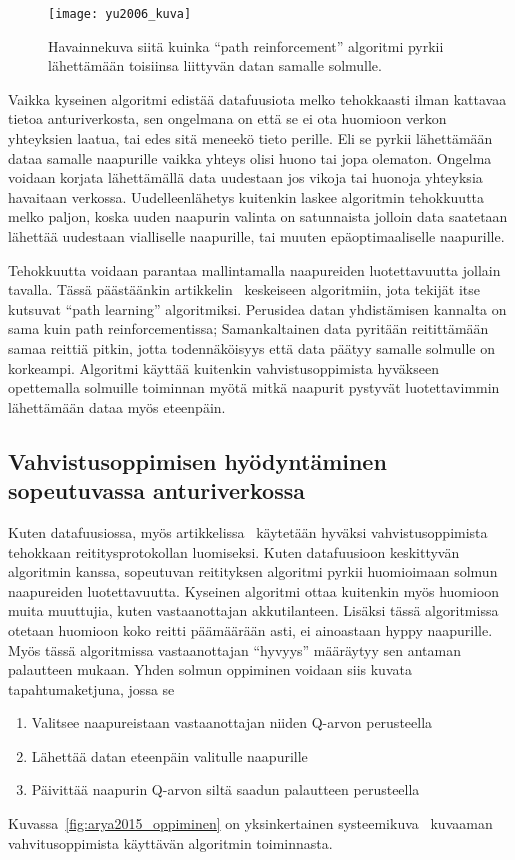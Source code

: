 \begin{figure}[h]
  \centering
  \texttt{[image: yu2006\_kuva]}
  \caption{Havainnekuva siitä kuinka ``path reinforcement'' algoritmi pyrkii
    lähettämään toisiinsa liittyvän datan samalle solmulle.~\parencite{Yu2006}}
\label{fig:yu2006}
\end{figure}

Vaikka kyseinen algoritmi edistää datafuusiota melko tehokkaasti ilman kattavaa
tietoa anturiverkosta, sen ongelmana on että se ei ota huomioon verkon
yhteyksien laatua, tai edes sitä meneekö tieto perille. Eli se pyrkii
lähettämään dataa samalle naapurille vaikka yhteys olisi huono tai jopa
olematon. Ongelma voidaan korjata lähettämällä data uudestaan jos vikoja tai
huonoja yhteyksia havaitaan verkossa. Uudelleenlähetys kuitenkin laskee
algoritmin tehokkuutta melko paljon, koska uuden naapurin valinta on
satunnaista jolloin data saatetaan lähettää uudestaan vialliselle naapurille,
tai muuten epäoptimaaliselle naapurille.

Tehokkuutta voidaan parantaa mallintamalla naapureiden luotettavuutta jollain
tavalla. Tässä päästäänkin artikkelin~\cite{Yu2006} keskeiseen algoritmiin,
jota tekijät itse kutsuvat ``path learning'' algoritmiksi. Perusidea datan
yhdistämisen kannalta on sama kuin path reinforcementissa; Samankaltainen data
pyritään reitittämään samaa reittiä pitkin, jotta todennäköisyys että data
päätyy samalle solmulle on korkeampi. Algoritmi käyttää kuitenkin
vahvistusoppimista hyväkseen opettemalla solmuille toiminnan myötä mitkä
naapurit pystyvät luotettavimmin lähettämään dataa myös eteenpäin.


\subsection{Vahvistusoppimisen hyödyntäminen sopeutuvassa anturiverkossa}


Kuten datafuusiossa, myös artikkelissa~\cite{Arya2015} käytetään hyväksi
vahvistusoppimista tehokkaan reititysprotokollan luomiseksi. Kuten datafuusioon
keskittyvän algoritmin kanssa, sopeutuvan reitityksen algoritmi pyrkii
huomioimaan solmun naapureiden luotettavuutta. Kyseinen algoritmi ottaa
kuitenkin myös huomioon muita muuttujia, kuten vastaanottajan akkutilanteen.
Lisäksi tässä algoritmissa otetaan huomioon koko reitti päämäärään asti, ei
ainoastaan hyppy naapurille. Myös tässä algoritmissa vastaanottajan ``hyvyys''
määräytyy sen antaman palautteen mukaan. Yhden solmun oppiminen voidaan siis
kuvata tapahtumaketjuna, jossa se
\begin{enumerate}
  \item Valitsee naapureistaan vastaanottajan niiden Q-arvon perusteella
  \item Lähettää datan eteenpäin valitulle naapurille
  \item Päivittää naapurin Q-arvon siltä saadun palautteen perusteella
\end{enumerate}
Kuvassa~\ref{fig:arya2015_oppiminen} on yksinkertainen
systeemikuva~\cite{Arya2015} kuvaaman vahvitusoppimista käyttävän algoritmin
toiminnasta.

